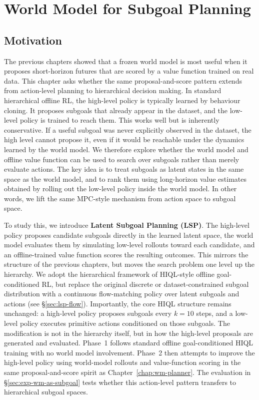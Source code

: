 \chapter{World Model for Subgoal Planning}
\label{chap:wm-as-subgoal}
\label{chap:latent-subgoal-planning}

\section{Motivation}
\label{sec:lsp-motivation}

The previous chapters showed that a frozen world model is most useful
when it proposes short-horizon futures that are scored by a value
function trained on real data. This chapter asks whether the same
proposal-and-score pattern extends from action-level planning to
hierarchical decision making.
In standard hierarchical offline RL, the high-level policy is typically learned by behaviour cloning. It proposes subgoals that already appear in the dataset, and the low-level policy is trained to reach them. This works well but is inherently conservative. If a useful subgoal was never explicitly observed in the dataset, the high level cannot propose it, even if it would be reachable under the dynamics learned by the world model.
We therefore explore whether the world model and offline value function can be used to search over subgoals rather than merely evaluate actions. The key idea is to treat subgoals as latent states in the same space as the world model, and to rank them using long-horizon value estimates obtained by rolling out the low-level policy inside the world model. In other words, we lift the same MPC-style mechanism from action space to subgoal space.

To study this, we introduce \textbf{Latent Subgoal Planning (LSP)}. The high-level policy proposes candidate subgoals directly in the learned latent space, the world model evaluates them by simulating low-level rollouts toward each candidate, and an offline-trained value function scores the resulting outcomes. This mirrors the structure of the previous chapters, but moves the search problem one level up the hierarchy.
We adopt the hierarchical framework of HIQL-style offline goal-conditioned RL, but replace the original discrete or dataset-constrained subgoal distribution with a continuous flow-matching policy over latent subgoals and actions (see \S\ref{sec:lsp-flow}). Importantly, the core HIQL structure remains unchanged: a high-level policy proposes subgoals every $k=10$ steps, and a low-level policy executes primitive actions conditioned on those subgoals. The modification is not in the hierarchy itself, but in how the high-level proposals are generated and evaluated.
Phase~1 follows standard offline goal-conditioned HIQL training with no world model involvement. Phase~2 then attempts to improve the high-level policy using world-model rollouts and value-function scoring in the same proposal-and-score spirit as Chapter~\ref{chap:wm-planner}. The evaluation in \S\ref{sec:exp-wm-as-subgoal} tests whether this action-level pattern transfers to hierarchical subgoal spaces.

